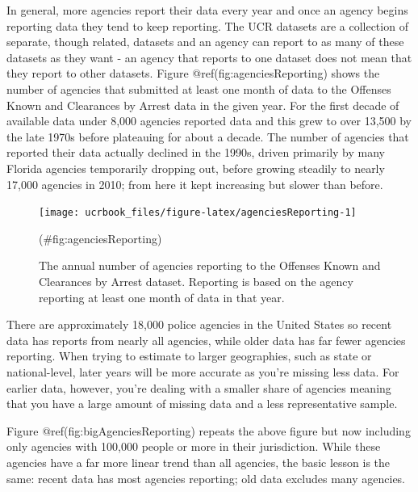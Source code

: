 \documentclass[
  12pt,
  openany]{book}
\begin{document}
In general, more agencies report their data every year and once an agency begins reporting data they tend to keep reporting. The UCR datasets are a collection of separate, though related, datasets and an agency can report to as many of these datasets as they want - an agency that reports to one dataset does not mean that they report to other datasets. Figure @ref(fig:agenciesReporting) shows the number of agencies that submitted at least one month of data to the Offenses Known and Clearances by Arrest data in the given year. For the first decade of available data under 8,000 agencies reported data and this grew to over 13,500 by the late 1970s before plateauing for about a decade. The number of agencies that reported their data actually declined in the 1990s, driven primarily by many Florida agencies temporarily dropping out, before growing steadily to nearly 17,000 agencies in 2010; from here it kept increasing but slower than before.

\begin{figure}

{\centering \texttt{[image: ucrbook\_files/figure-latex/agenciesReporting-1]} 

}

\caption{The annual number of agencies reporting to the Offenses Known and Clearances by Arrest dataset. Reporting is based on the agency reporting at least one month of data in that year.}(\#fig:agenciesReporting)
\end{figure}

There are approximately 18,000 police agencies in the United States so recent data has reports from nearly all agencies, while older data has far fewer agencies reporting. When trying to estimate to larger geographies, such as state or national-level, later years will be more accurate as you're missing less data. For earlier data, however, you're dealing with a smaller share of agencies meaning that you have a large amount of missing data and a less representative sample.

Figure @ref(fig:bigAgenciesReporting) repeats the above figure but now including only agencies with 100,000 people or more in their jurisdiction. While these agencies have a far more linear trend than all agencies, the basic lesson is the same: recent data has most agencies reporting; old data excludes many agencies.
\end{document}

